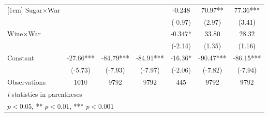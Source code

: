 {\begin{tabular}{l*{6}{c}}
[1em]
Sugar$\times$War  &                     &                     &                     &      -0.248         &       70.97** &       77.36***\\
                    &                     &                     &                     &     (-0.97)         &      (2.97)         &      (3.41)         \\
[1em]
Wine$\times$War   &                     &                     &                     &      -0.347*  &       33.80         &       28.32         \\
                    &                     &                     &                     &     (-2.14)         &      (1.35)         &      (1.16)         \\
[1em]
Constant            &      -27.66***&      -84.79***&      -84.91***&      -16.36*  &      -90.47***&      -86.15***\\
                    &     (-5.73)         &     (-7.93)         &     (-7.97)         &     (-2.06)         &     (-7.82)         &     (-7.94)         \\
\hline
Observations        &        1010         &        9792         &        9792         &         445         &        9792         &        9792         \\
\hline\hline
\multicolumn{7}{l}{\footnotesize \textit{t} statistics in parentheses}\\
\multicolumn{7}{l}{\footnotesize * \(p<0.05\), ** \(p<0.01\), *** \(p<0.001\)}\\
\end{tabular}
}
